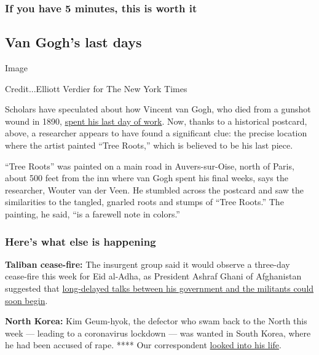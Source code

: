 \hypertarget{if-you-have-5-minutes-this-is-worth-it}{%
\subsubsection{If you have 5 minutes, this is worth
it}\label{if-you-have-5-minutes-this-is-worth-it}}

\hypertarget{van-goghs-last-days}{%
\subsection{Van Gogh's last days}\label{van-goghs-last-days}}

Image

Credit...Elliott Verdier for The New York Times

Scholars have speculated about how Vincent van Gogh, who died from a
gunshot wound in 1890,
\href{https://www.nytimes.com/2020/07/28/arts/design/vincent-van-gogh-tree-roots.html}{spent
his last day of work}. Now, thanks to a historical postcard, above, a
researcher appears to have found a significant clue: the precise
location where the artist painted ``Tree Roots,'' which is believed to
be his last piece.

``Tree Roots'' was painted on a main road in Auvers-sur-Oise, north of
Paris, about 500 feet from the inn where van Gogh spent his final weeks,
says the researcher, Wouter van der Veen. He stumbled across the
postcard and saw the similarities to the tangled, gnarled roots and
stumps of ``Tree Roots.'' The painting, he said, ``is a farewell note in
colors.''

\hypertarget{heres-what-else-is-happening}{%
\subsubsection{Here's what else is
happening}\label{heres-what-else-is-happening}}

\textbf{Taliban cease-fire:} The insurgent group said it would observe a
three-day cease-fire this week for Eid al-Adha, as President Ashraf
Ghani of Afghanistan suggested that
\href{https://www.nytimes.com/2020/07/28/world/asia/afghanistan-cease-fire-taliban.html}{long-delayed
talks between his government and the militants could soon begin}.

\textbf{North Korea:} Kim Geum-hyok, the defector who swam back to the
North this week --- leading to a coronavirus lockdown --- was wanted in
South Korea, where he had been accused of rape. **** Our correspondent
\href{https://www.nytimes.com/2020/07/28/world/asia/north-korea-defector-coronavirus.html}{looked
into his life}.

